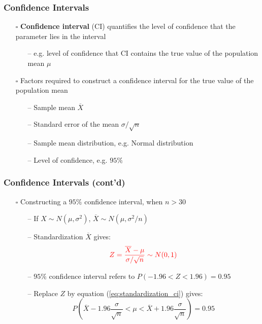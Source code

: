 \documentclass[handout]{beamer}
\begin{document}
\begin{frame}
    \frametitle{Confidence Intervals}
    \begin{itemize}[wide = 0pt]
        \item[$\square$] \textbf{\color{red}Confidence interval} (CI) quantifies the level of confidence that the parameter lies in the interval
        \begin{itemize}
            \item[--] e.g. level of confidence that CI contains the true value of the population mean $\mu$
        \end{itemize}
        \vspace{5pt}
        \item[$\square$] Factors required to construct a confidence interval for the true value of the population mean
        \begin{itemize}
            \item[--] {\color{red}Sample mean} $\overline{X}$
            \item[--] {\color{red}Standard error} of the mean $\sigma/\sqrt{n}$
            \item[--] {\color{red}Sample mean distribution}, e.g. Normal distribution
            \item[--] {\color{red}Level of confidence}, e.g. $95\%$
        \end{itemize}
    \end{itemize}
    \vspace*{\fill}
\end{frame}

\begin{frame}
    \frametitle{Confidence Intervals (cont'd)}
    \begin{itemize}[wide = 0pt]
        \item[$\square$] Constructing a $95\%$ confidence interval, when $n>30$
        \begin{itemize}
            \item[--] If \small{$X\sim N(\mu, \sigma^2)$}, \small{$\overline{X}\sim N(\mu, \sigma^2/n)$}
            \item[--] Standardization $\overline{X}$ gives:
            \begin{equation}
                {\color{red}Z=\frac{\overline{X}-\mu}{\sigma/\sqrt{n}}\sim N(0,1)}
                \label{eq:standardization_ci}
            \end{equation}
            \item[--] $95\%$ confidence interval refers to \small{$P(-1.96<Z<1.96)=0.95$}
            \item[--] Replace $Z$ by equation (\ref{eq:standardization_ci}) gives:
            \begin{equation*}
                P(\overline{X}-1.96\frac{\sigma}{\sqrt{n}}<\mu<\overline{X}+1.96\frac{\sigma}{\sqrt{n}})=0.95
            \end{equation*}
        \end{itemize}
    \end{itemize}
    \vspace*{\fill}
\end{frame}
\end{document}
